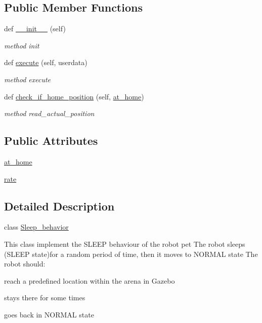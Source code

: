 \subsection*{Public Member Functions}
\begin{DoxyCompactItemize}
\item 
def \hyperlink{classbehavior__manager_1_1Sleep__behavior_a778df3c5a36999ef4792e6ac444bd7f3}{\+\_\+\+\_\+init\+\_\+\+\_\+} (self)
\begin{DoxyCompactList}\small\item\em method init \end{DoxyCompactList}\item 
def \hyperlink{classbehavior__manager_1_1Sleep__behavior_a02d87859cb76d2dbdf78d9d6e2452782}{execute} (self, userdata)
\begin{DoxyCompactList}\small\item\em method execute \end{DoxyCompactList}\item 
def \hyperlink{classbehavior__manager_1_1Sleep__behavior_af325af9244bcfde6b9954e8a2dfcda92}{check\+\_\+if\+\_\+home\+\_\+position} (self, \hyperlink{classbehavior__manager_1_1Sleep__behavior_ac8a99e565ddf742e5d3d25121bcc99bc}{at\+\_\+home})
\begin{DoxyCompactList}\small\item\em method read\+\_\+actual\+\_\+position \end{DoxyCompactList}\end{DoxyCompactItemize}
\subsection*{Public Attributes}
\begin{DoxyCompactItemize}
\item 
\hyperlink{classbehavior__manager_1_1Sleep__behavior_ac8a99e565ddf742e5d3d25121bcc99bc}{at\+\_\+home}
\item 
\hyperlink{classbehavior__manager_1_1Sleep__behavior_a75cca73975838d3ee66cc687726685de}{rate}
\end{DoxyCompactItemize}


\subsection{Detailed Description}
class \hyperlink{classbehavior__manager_1_1Sleep__behavior}{Sleep\+\_\+behavior} 

This class implement the S\+L\+E\+EP behaviour of the robot pet The robot sleeps (S\+L\+E\+EP state)for a random period of time, then it moves to N\+O\+R\+M\+AL state The robot should\+:
\begin{DoxyItemize}
\item reach a predefined location within the arena in Gazebo
\item stays there for some times
\item goes back in N\+O\+R\+M\+AL state 
\end{DoxyItemize}

